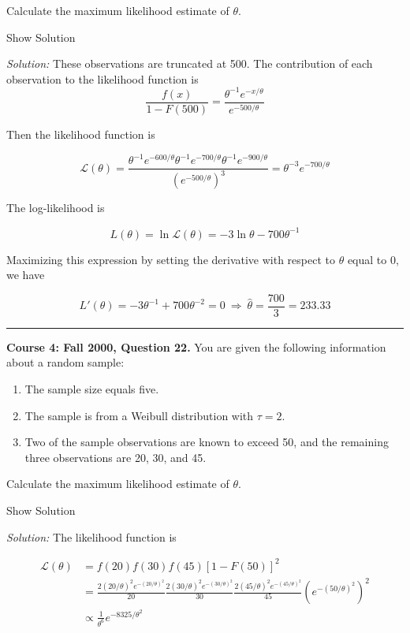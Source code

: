 \documentclass[]{book}
\providecommand{\tightlist}{%
  \setlength{\itemsep}{0pt}\setlength{\parskip}{0pt}}
\theoremstyle{definition}
\theoremstyle{definition}
\theoremstyle{definition}
\theoremstyle{remark}
\begin{document}
Calculate the maximum likelihood estimate of \(\theta\).

Show Solution

\hypertarget{toggleExamC152}{}
\emph{Solution:} These observations are truncated at 500. The
contribution of each observation to the likelihood function is
\[\frac{f(x)}{1-F(500)} = \frac{\theta^{-1}e^{-x/\theta}}{e^{-500/\theta}}\]

Then the likelihood function is

\[\mathcal{L}(\theta)= \frac{\theta^{-1} e^{-600/\theta} \theta^{-1} e^{-700/\theta} \theta^{-1} e^{-900/\theta}}{(e^{-500/\theta})^3} = \theta^{-3}e^{-700/\theta}\]

The log-likelihood is

\[L(\theta) = \ln\mathcal{L}(\theta) = -3\ln \theta - 700\theta^{-1}\]

Maximizing this expression by setting the derivative with respect to
\(\theta\) equal to 0, we have

\[L'(\theta) = -3\theta^{-1} + 700\theta^{-2} = 0 \ \Rightarrow \ \hat{\theta} = \frac{700}{3} = 233.33\]

\begin{center}\rule{0.5\linewidth}{\linethickness}\end{center}

\textbf{Course 4: Fall 2000, Question 22.} You are given the following
information about a random sample:

\begin{enumerate}
\def\labelenumi{(\roman{enumi})}
\tightlist
\item
  The sample size equals five.
\item
  The sample is from a Weibull distribution with \(\tau=2\).
\item
  Two of the sample observations are known to exceed 50, and the
  remaining three observations are 20, 30, and 45.
\end{enumerate}

Calculate the maximum likelihood estimate of \(\theta\).

Show Solution

\hypertarget{toggleF00Q22}{}
\emph{Solution:} The likelihood function is

\[\begin{aligned} 
\mathcal{L}(\theta) &= f(20) f(30) f(45) [1-F(50)]^2 \\
&= \frac{2(20/\theta)^2 e^{-(20/\theta)^2}}{20} \frac{2(30/\theta)^2 e^{-(30/\theta)^2}}{30} \frac{2(45/\theta)^2 e^{-(45/\theta)^2}}{45}(e^{-(50/\theta)^2})^2 \\
&\propto \frac{1}{\theta^6} e^{-8325/\theta^2}
\end{aligned}\]
\end{document}
